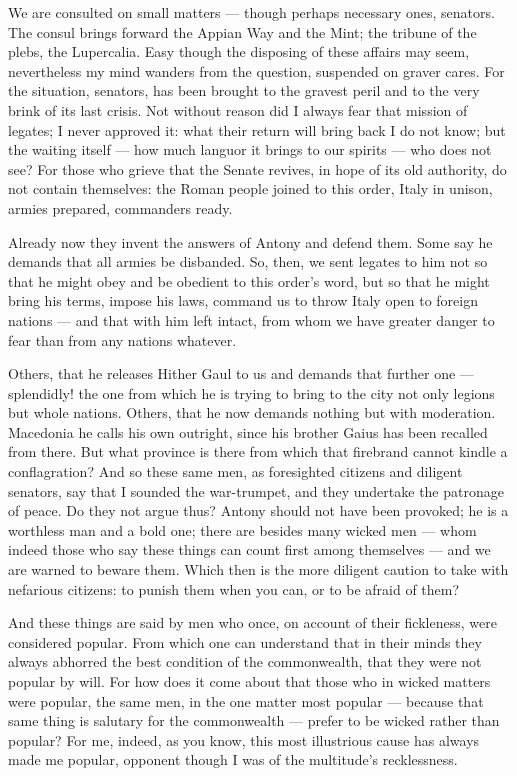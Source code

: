 
 We are consulted on small matters --- though perhaps necessary ones, senators. The consul brings forward the Appian Way and the Mint; the tribune of the plebs, the Lupercalia. Easy though the disposing of these affairs may seem, nevertheless my mind wanders from the question, suspended on graver cares. For the situation, senators, has been brought to the gravest peril and to the very brink of its last crisis. Not without reason did I always fear that mission of legates; I never approved it: what their return will bring back I do not know; but the waiting itself --- how much languor it brings to our spirits --- who does not see? For those who grieve that the Senate revives, in hope of its old authority, do not contain themselves: the Roman people joined to this order, Italy in unison, armies prepared, commanders ready.

 Already now they invent the answers of Antony and defend them. Some say he demands that all armies be disbanded. So, then, we sent legates to him not so that he might obey and be obedient to this order's word, but so that he might bring his terms, impose his laws, command us to throw Italy open to foreign nations --- and that with him left intact, from whom we have greater danger to fear than from any nations whatever.

 Others, that he releases Hither Gaul to us and demands that further one --- splendidly! the one from which he is trying to bring to the city not only legions but whole nations. Others, that he now demands nothing but with moderation. Macedonia he calls his own outright, since his brother Gaius has been recalled from there. But what province is there from which that firebrand cannot kindle a conflagration? And so these same men, as foresighted citizens and diligent senators, say that I sounded the war-trumpet, and they undertake the patronage of peace. Do they not argue thus? Antony should not have been provoked; he is a worthless man and a bold one; there are besides many wicked men --- whom indeed those who say these things can count first among themselves --- and we are warned to beware them. Which then is the more diligent caution to take with nefarious citizens: to punish them when you can, or to be afraid of them?

 And these things are said by men who once, on account of their fickleness, were considered popular. From which one can understand that in their minds they always abhorred the best condition of the commonwealth, that they were not popular by will. For how does it come about that those who in wicked matters were popular, the same men, in the one matter most popular --- because that same thing is salutary for the commonwealth --- prefer to be wicked rather than popular? For me, indeed, as you know, this most illustrious cause has always made me popular, opponent though I was of the multitude's recklessness.

